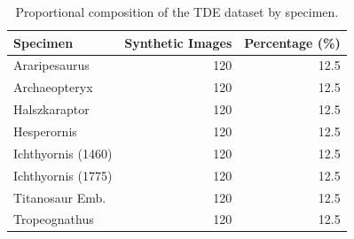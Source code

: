 \begin{table}[htbp]
\caption{Proportional composition of the TDE dataset by specimen.}
\label{tab:dataset_composition}
\begin{tabular}{lrr}
\toprule
Specimen & Synthetic Images & Percentage (\%) \\
\midrule
Araripesaurus & 120 & 12.5 \\
Archaeopteryx & 120 & 12.5 \\
Halszkaraptor & 120 & 12.5 \\
Hesperornis & 120 & 12.5 \\
Ichthyornis (1460) & 120 & 12.5 \\
Ichthyornis (1775) & 120 & 12.5 \\
Titanosaur Emb. & 120 & 12.5 \\
Tropeognathus & 120 & 12.5 \\
\bottomrule
\end{tabular}
\end{table}
